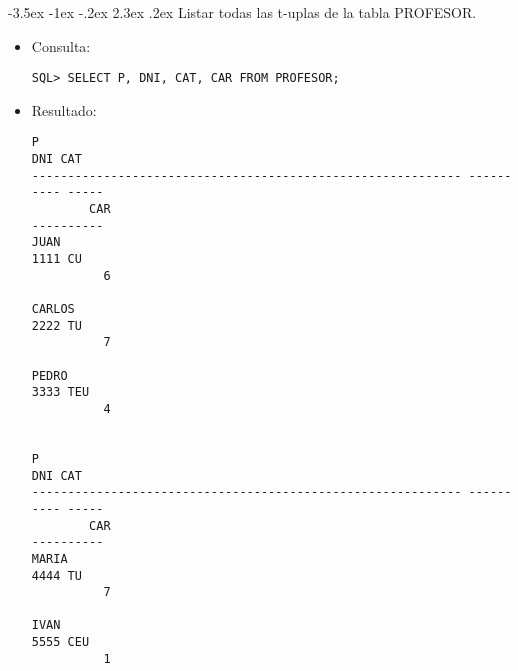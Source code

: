 \documentclass[11pt]{report}
\makeatletter
\renewcommand\chapter{\@startsection{chapter}{0}{\z@}%
    {-3.5ex \@plus -1ex \@minus -.2ex}%
    {2.3ex \@plus.2ex}%
    {\normalfont\Large\bfseries}}
\makeatother
\begin{document}
\chapter{Listar todas las t-uplas de la tabla PROFESOR.}
\begin{itemize}
  \item Consulta:
  \begin{verbatim}
SQL> SELECT P, DNI, CAT, CAR FROM PROFESOR;
  \end{verbatim}
  \item{Resultado:}
  \begin{verbatim}
P                                                                   DNI CAT     
------------------------------------------------------------ ---------- -----   
        CAR                                                                      
----------                                                                      
JUAN                                                               1111 CU      
          6                                                                      
                                                                                
CARLOS                                                             2222 TU      
          7                                                                      
                                                                                
PEDRO                                                              3333 TEU     
          4                                                                      
                                                                                

P                                                                   DNI CAT     
------------------------------------------------------------ ---------- -----   
        CAR                                                                      
----------                                                                      
MARIA                                                              4444 TU      
          7                                                                      
                                                                                
IVAN                                                               5555 CEU     
          1                                                                      
                                                                                

\end{verbatim}
\end{itemize}
\end{document}
